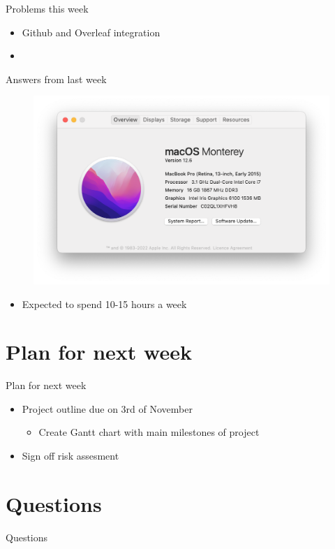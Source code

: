 \documentclass{beamer}
\begin{document}
\begin{frame}{Problems this week}
    \begin{itemize}
        \item Github and Overleaf integration
        \item 
    \end{itemize}
\end{frame}

\begin{frame}{Answers from last week}
\begin{figure}
    \centering
    \includegraphics[scale=0.35]{Weekly meeting slides/meeting 2/Screenshot 2023-10-27 at 10.20.22 am.png}
    \label{fig:enter-label}
\end{figure}
\begin{itemize}
    \item Expected to spend 10-15 hours a week
\end{itemize}

\end{frame}

\section{Plan for next week}
\begin{frame}{Plan for next week}
    \begin{itemize}
    \item Project outline due on 3rd of November
    \begin{itemize}
      \item Create Gantt chart with main milestones of project
    \end{itemize}
    \item Sign off risk assesment
    \end{itemize}
\end{frame}

\section{Questions}

\begin{frame}{Questions}
    
\end{frame}
\end{document}
